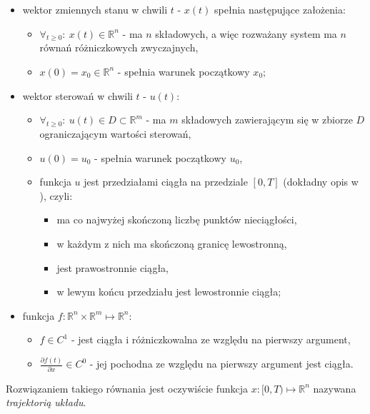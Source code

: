 \begin{itemize}
    \item wektor zmiennych stanu w chwili $t$ - $x(t)$ spełnia następujące założenia:
    \begin{itemize}
        \item $\forall_{t \geq 0}:~ x(t) \in \mathbb{R}^{n}$ - ma $n$ składowych, a więc rozważany system ma $n$ równań różniczkowych zwyczajnych,
        \item $x(0) = x_{0} \in \mathbb{R}^{n}$ - spełnia warunek początkowy $x_{0}$;
    \end{itemize}
    \item wektor sterowań w chwili $t$ - $u(t)$:
    \begin{itemize}
        \item $\forall_{t \geq 0}:~ u(t) \in D \subset \mathbb{R}^{m}$ - ma $m$ składowych zawierającym się w zbiorze $D$ ograniczającym wartości sterowań,
        \item $u(0) = u_{0}$ - spełnia warunek początkowy $u_{0}$,
        \item funkcja $u$ jest przedziałami ciągła na przedziale $[0, T]$ (dokładny opis w \cite{Korytowski2015}), czyli:
        \begin{itemize}
            \item ma co najwyżej skończoną liczbę punktów nieciągłości,
            \item w każdym z nich ma skończoną granicę lewostronną,
            \item jest prawostronnie ciągła,
            \item w lewym końcu przedziału jest lewostronnie ciągła;
        \end{itemize}
    \end{itemize}
    \item funkcja $f: \mathbb{R}^{n} \times \mathbb{R}^{m} \longmapsto \mathbb{R}^{n}$:
    \begin{itemize}
        \item $f \in C^{1}$ - jest ciągła i różniczkowalna ze względu na pierwszy argument,
        \item $\frac{\partial f(t)}{\partial x} \in C^{0}$ - jej pochodna ze względu na pierwszy argument jest ciągła.
    \end{itemize}
\end{itemize}

Rozwiązaniem takiego równania jest oczywiście funkcja $x: [0, T) \longmapsto \mathbb{R}^{n}$ nazywana \emph{trajektorią układu}. 

